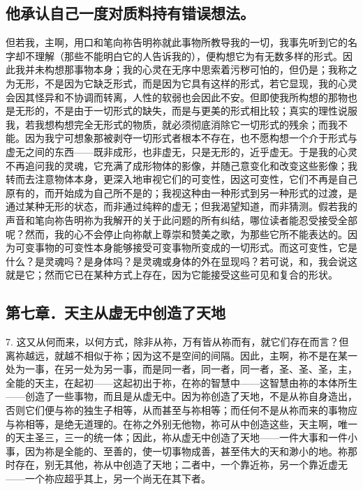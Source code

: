 \subsection{他承认自己一度对质料持有错误想法。}

但若我，主啊，用口和笔向祢告明祢就此事物所教导我的一切，我事先听到它的名字却不理解（那些不能明白它的人告诉我的），便构想它为有无数多样的形式。因此我并未构想那事物本身；我的心灵在无序中思索着污秽可怕的，但仍是；我称之为无形，不是因为它缺乏形式，而是因为它具有这样的形式，若它显现，我的心灵会因其怪异和不协调而转离，人性的软弱也会因此不安。但即使我所构想的那物也是无形的，不是由于一切形式的缺失，而是与更美的形式相比较；真实的理性说服我，若我想构想完全无形式的物质，就必须彻底消除它一切形式的残余；而我不能。因为我宁可想象那被剥夺一切形式者根本不存在，也不愿构想一个介于形式与虚无之间的东西——既非成形，也非虚无，只是无形的，近乎虚无。于是我的心灵不再追问我的灵魂，它充满了成形物体的影像，并随己意变化和改变这些影像；我转而去注意物体本身，更深入地审视它们的可变性，因这可变性，它们不再是自己原有的，而开始成为自己所不是的；我视这种由一种形式到另一种形式的过渡，是通过某种无形的状态，而非通过纯粹的虚无；但我渴望知道，而非猜测。假若我的声音和笔向祢告明祢为我解开的关于此问题的所有纠结，哪位读者能忍受接受全部呢？然而，我的心不会停止向祢献上尊崇和赞美之歌，为那些它所不能表达的。因为可变事物的可变性本身能够接受可变事物所变成的一切形式。而这可变性，它是什么？是灵魂吗？是身体吗？是灵魂或身体的外在显现吗？若可说，和，我会说这就是它；然而它已在某种方式上存在，因为它能接受这些可见和复合的形状。\par


\subsection{第七章．天主从虚无中创造了天地}

7. 这又从何而来，以何方式，除非从祢，万有皆从祢而有，就它们存在而言？但离祢越远，就越不相似于祢；因为这不是空间的间隔。因此，主啊，祢不是在某一处为一事，在另一处为另一事，而是同一者，同一者，同一者，圣、圣、圣，主，全能的天主，在起初——这起初出于祢，在祢的智慧中——这智慧由祢的本体所生——创造了一些事物，而且是从虚无中。因为祢创造了天地，不是从祢自身造出，否则它们便与祢的独生子相等，从而甚至与祢相等；而任何不是从祢而来的事物应与祢相等，是绝无道理的。在祢之外别无他物，祢可从中创造这些，天主啊，唯一的天主圣三，三一的统一体；因此，祢从虚无中创造了天地——一件大事和一件小事，因为祢是全能的、至善的，使一切事物成善，甚至伟大的天和渺小的地。祢那时存在，别无其他，祢从中创造了天地；二者中，一个靠近祢，另一个靠近虚无——一个祢应超乎其上，另一个尚无在其下者。\par

